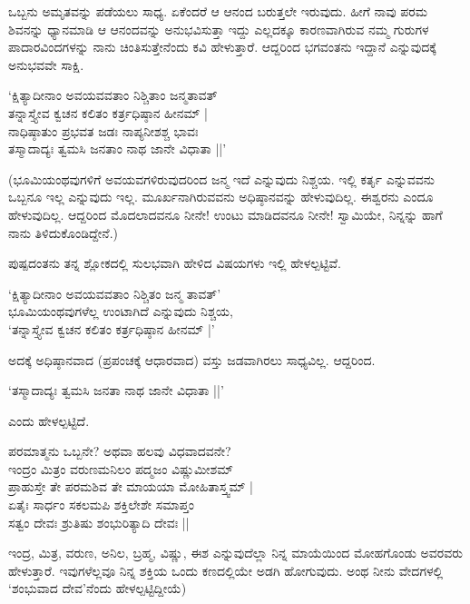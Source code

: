 ಒಬ್ಬನು ಅಮೃತವನ್ನು ಪಡೆಯಲು ಸಾಧ್ಯ. ಏಕೆಂದರೆ ಆ ಆನಂದ ಬರುತ್ತಲೇ ಇರುವುದು. ಹೀಗೆ ನಾವು ಪರಮ ಶಿವನನ್ನು ಧ್ಯಾನಮಾಡಿ ಆ ಆನಂದವನ್ನು ಅನುಭವಿಸುತ್ತಾ ಇದ್ದು ಎಲ್ಲದಕ್ಕೂ ಕಾರಣವಾಗಿರುವ ನಮ್ಮ ಗುರುಗಳ ಪಾದಾರವಿಂದಗಳನ್ನು ನಾನು ಚಿಂತಿಸುತ್ತೇನೆಂದು ಕವಿ ಹೇಳುತ್ತಾರೆ. ಆದ್ದರಿಂದ ಭಗವಂತನು ಇದ್ದಾನೆ ಎನ್ನುವುದಕ್ಕೆ ಅನುಭವವೇ ಸಾಕ್ಷಿ.

\begin{shloka}
`ಕ್ಷಿತ್ಯಾದೀನಾಂ ಅವಯವವತಾಂ ನಿಶ್ಚಿತಾಂ ಜನ್ಮತಾವತ್\\
ತನ್ನಾಸ್ತ್ಯೇವ ಕ್ವಚನ ಕಲಿತಂ ಕರ್ತ್ರಧಿಷ್ಠಾನ ಹೀನಮ್ |\\
ನಾಧಿಷ್ಠಾತುಂ ಪ್ರಭವತ ಜಡಃ ನಾಪ್ಯನೀಶಶ್ಚ ಭಾವಃ\\
ತಸ್ಮಾದಾದ್ಯಃ ತ್ವಮಸಿ ಜನತಾಂ ನಾಥ ಜಾನೇ ವಿಧಾತಾ ||'
\end{shloka}

(ಭೂಮಿಯಂಥವುಗಳಿಗೆ ಅವಯವಗಳಿರುವುದರಿಂದ ಜನ್ಮ ಇದೆ ಎನ್ನುವುದು ನಿಶ್ಚಯ. ಇಲ್ಲಿ ಕರ್ತೃ ಎನ್ನುವವನು ಒಬ್ಬನೂ ಇಲ್ಲ ಎನ್ನುವುದು ಇಲ್ಲ. ಮೂರ್ಖನಾಗಿರುವವನು ಅಧಿಷ್ಠಾನವನ್ನು ಹೇಳುವುದಿಲ್ಲ. ಈಶ್ವರನು ಎಂದೂ ಹೇಳುವುದಿಲ್ಲ. ಆದ್ದರಿಂದ ಮೊದಲಾದವನೂ ನೀನೇ! ಉಂಟು ಮಾಡಿದವನೂ ನೀನೇ! ಸ್ವಾಮಿಯೇ, ನಿನ್ನನ್ನು ಹಾಗೆ ನಾನು ತಿಳಿದುಕೊಂಡಿದ್ದೇನೆ.)

ಪುಷ್ಪದಂತನು ತನ್ನ ಶ್ಲೋಕದಲ್ಲಿ ಸುಲಭವಾಗಿ ಹೇಳಿದ ವಿಷಯಗಳು ಇಲ್ಲಿ ಹೇಳಲ್ಪಟ್ಟಿವೆ.

\begin{shloka}
`ಕ್ಷಿತ್ಯಾದೀನಾಂ ಅವಯವವತಾಂ ನಿಶ್ಚಿತಂ ಜನ್ಮ ತಾವತ್'\\
ಭೂಮಿಯಂಥವುಗಳೆಲ್ಲ ಉಂಟಾಗಿದೆ ಎನ್ನುವುದು ನಿಶ್ಚಯ,\\
`ತನ್ನಾಸ್ತ್ಯೇವ ಕ್ವಚನ ಕಲಿತಂ ಕರ್ತ್ರಧಿಷ್ಠಾನ ಹೀನಮ್ |'
\end{shloka}

ಅದಕ್ಕೆ ಅಧಿಷ್ಠಾನವಾದ (ಪ್ರಪಂಚಕ್ಕೆ ಆಧಾರವಾದ) ವಸ್ತು ಜಡವಾಗಿರಲು ಸಾಧ್ಯವಿಲ್ಲ. ಆದ್ದರಿಂದ.

\begin{shloka}
`ತಸ್ಮಾದಾದ್ಯಃ ತ್ವಮಸಿ ಜನತಾ ನಾಥ ಜಾನೇ ವಿಧಾತಾ ||'
\end{shloka}

ಎಂದು ಹೇಳಲ್ಪಟ್ಟಿದೆ.

\begin{shloka}
ಪರಮಾತ್ಮನು ಒಬ್ಬನೇ? ಅಥವಾ ಹಲವು ವಿಧವಾದವನೇ?\\[5pt]
ಇಂದ್ರಂ ಮಿತ್ರಂ ವರುಣಮನಿಲಂ ಪದ್ಮಜಂ ವಿಷ್ಣುಮೀಶಮ್\\
ಪ್ರಾಹುಸ್ತೇ ತೇ ಪರಮಶಿವ ತೇ ಮಾಯಯಾ ಮೋಹಿತಾಸ್ತ್ವಮ್ |\\[5pt]
ಏತೈಃ ಸಾರ್ಧಂ ಸಕಲಮಪಿ ಶಕ್ತಿಲೇಶೇ ಸಮಾಪ್ತಂ\\
ಸತ್ವಂ ದೇವಃ ಶ್ರುತಿಷು ಶಂಭುರಿತ್ಯಾದಿ ದೇವಃ ||
\end{shloka}

ಇಂದ್ರ, ಮಿತ್ರ, ವರುಣ, ಅನಿಲ, ಬ್ರಹ್ಮ, ವಿಷ್ಣು, ಈಶ ಎನ್ನುವುದೆಲ್ಲಾ ನಿನ್ನ ಮಾಯೆಯಿಂದ ಮೋಹಗೊಂಡು ಅವರವರು ಹೇಳುತ್ತಾರೆ. ಇವುಗಳೆಲ್ಲವೂ ನಿನ್ನ ಶಕ್ತಿಯ ಒಂದು ಕಣದಲ್ಲಿಯೇ ಅಡಗಿ ಹೋಗುವುದು. ಅಂಥ ನೀನು ವೇದಗಳಲ್ಲಿ `ಶಂಭುವಾದ ದೇವ'ನೆಂದು ಹೇಳಲ್ಪಟ್ಟಿದ್ದೀಯೆ)

